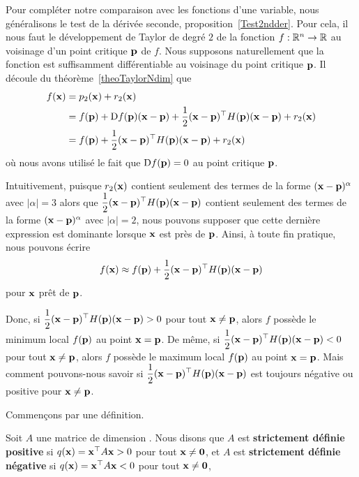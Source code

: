 {Pour compléter notre comparaison avec les fonctions d'une variable, nous
généralisons le test de la dérivée seconde,
proposition~\ref{Test2ndder}.   Pour cela, il nous faut le
développement de Taylor de degré $2$ de la fonction $f:\mathbb{R}^n \to \mathbb{R}$
au voisinage d'un point critique $\mathbf{p}$ de $f$.  Nous supposons
naturellement que la fonction est suffisamment différentiable au
voisinage du point critique $\mathbf{p}$.  Il découle du
théorème~\ref{theoTaylorNdim} que
\begin{align*}
f(\mathbf{x}) &= p_2(\mathbf{x})  + r_2(\mathbf{x}) \\
&= f(\mathbf{p}) + \mathrm{D} f(\mathbf{p}) (\mathbf{x} - \mathbf{p}) +
  \frac{1}{2} (\mathbf{x} - \mathbf{p})^\top H(\mathbf{p}) (\mathbf{x} - \mathbf{p})
  + r_2(\mathbf{x}) \\
&= f(\mathbf{p})
  + \frac{1}{2} (\mathbf{x} - \mathbf{p})^\top H(\mathbf{p}) (\mathbf{x} - \mathbf{p})
  + r_2(\mathbf{x})
\end{align*}
où nous avons utilisé le fait que  $\mathrm{D} f(\mathbf{p}) = 0$ au
point critique $\mathbf{p}$.

Intuitivement, puisque $r_2(\mathbf{x})$ contient seulement des termes de
la forme $(\mathbf{x} - \mathbf{p})^{\alpha}$ avec $|\alpha| = 3$ alors que
$\displaystyle \frac{1}{2} (\mathbf{x} - \mathbf{p})^\top H(\mathbf{p}) 
(\mathbf{x} - \mathbf{p})$ contient seulement des termes de la forme
$(\mathbf{x} - \mathbf{p})^{\alpha}$ avec $|\alpha| = 2$, nous pouvons supposer
que cette dernière expression est dominante lorsque $\mathbf{x}$ est près
de $\mathbf{p}$.  Ainsi, à toute fin pratique, nous pouvons écrire
\[
  f(\mathbf{x}) \approx f(\mathbf{p}) + \frac{1}{2} (\mathbf{x} - \mathbf{p})^\top
  H(\mathbf{p})(\mathbf{x} - \mathbf{p}) 
\]
pour $\mathbf{x}$ prêt de $\mathbf{p}$.

Donc, si $\displaystyle \frac{1}{2} (\mathbf{x} - \mathbf{p})^\top H(\mathbf{p})
(\mathbf{x} - \mathbf{p}) > 0$ pour tout $\mathbf{x} \neq \mathbf{p}$, alors
$f$ possède le minimum local $f(\mathbf{p})$ au point
$\mathbf{x} = \mathbf{p}$.  De même, si
$\displaystyle \frac{1}{2} (\mathbf{x} - \mathbf{p})^\top H(\mathbf{p})
(\mathbf{x} - \mathbf{p}) < 0$ pour tout $\mathbf{x} \neq \mathbf{p}$, alors
$f$ possède le maximum local $f(\mathbf{p})$ au point
$\mathbf{x} = \mathbf{p}$.  Mais comment pouvons-nous savoir si 
$\displaystyle \frac{1}{2} (\mathbf{x} - \mathbf{p})^\top H(\mathbf{p})
(\mathbf{x} - \mathbf{p})$ est toujours négative ou positive pour
$\mathbf{x} \neq \mathbf{p}$.

Commençons par une définition.

\begin{focus}{\dfn}
Soit $A$ une matrice de dimension .  Nous disons que $A$ est 
{\bfseries strictement définie positive} si
$q(\mathbf{x}) = \mathbf{x}^\top A \mathbf{x} > 0$ pour tout $\mathbf{x} \neq \mathbf{0}$, et
$A$ est {\bfseries strictement définie négative} si
$q(\mathbf{x}) = \mathbf{x}^\top A \mathbf{x} < 0$ pour tout $\mathbf{x} \neq \mathbf{0}$,
\end{focus}

}
